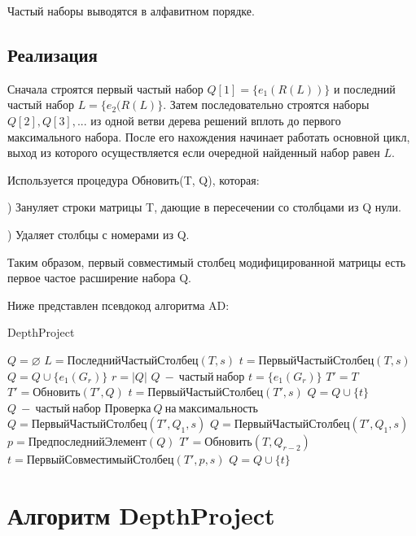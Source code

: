 \documentclass[a4paper, 12pt, oneside]{scrartcl}
\begin{document}
Частый наборы выводятся в алфавитном порядке.

\subsection{Реализация}

Сначала строятся первый частый набор $Q[1] = \{e_1(R(L))\}$ и последний частый набор $L = \{e_2(R(L)\}$. Затем последовательно строятся наборы $Q[2], Q[3], ...$ из одной ветви дерева решений вплоть до первого максимального набора. После его нахождения начинает работать основной цикл, выход из которого осуществляется если очередной найденный набор равен $L$.

Используется процедура Обновить(T, Q), которая:

) Зануляет строки матрицы T, дающие в пересечении со столбцами из Q нули.

) Удаляет столбцы с номерами из Q.

Таким образом, первый совместимый столбец модифицированной матрицы есть первое частое расширение набора Q.

Ниже представлен псевдокод алгоритма AD:

\begin{algorithm}[H]
\caption{DepthProject}\label{alg:Examples}
\begin{algorithmic}[1]
	\State $Q = \varnothing$
	\State $L = ПоследнийЧастыйСтолбец(T, s)$
	\State $t = ПервыйЧастыйСтолбец(T, s)$
		\State $Q = Q \cup \{e_1(G_r)\}$
		\Comment $r = |Q|$
		\State $Q\ -\ частый\ набор$
		\State $t = \{e_1(G_r)\}$
	\EndWhile
	\State $T' = T$
		\State $T' = Обновить(T', Q)$
		\State $t = ПервыйЧастыйСтолбец(T', s)$
			\State $Q = Q \cup \{t\}$
		\Else
			\State $Q\ -\ частый\ набор$
			\State $Проверка\ Q\ на\ максимальность$
				\State $Q = ПервыйЧастыйСтолбец(T', Q_1, s)$
			\Else
					\State $Q = ПервыйЧастыйСтолбец(T', Q_1, s)$
				\Else
					\State $p = ПредпоследнийЭлемент(Q)$
					\State $T' = Обновить(T, Q_{r-2})$
					\State $t = ПервыйСовместимыйСтолбец(T', p, s)$
					\State $Q = Q \cup \{t\}$
				\EndIf
			\EndIf
		\EndIf
	\EndWhile
\EndProcedure
\end{algorithmic}
\end{algorithm}

\section{Алгоритм DepthProject}
\end{document}
